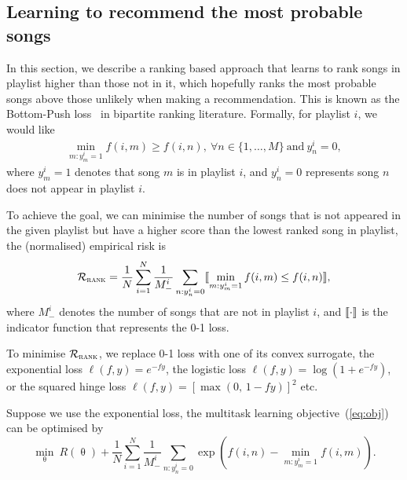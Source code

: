 \subsection{Learning to recommend the most probable songs}
\label{ssec:bploss}


In this section, we describe a ranking based approach that learns to rank songs in playlist higher
than those not in it, which hopefully ranks the most probable songs above those unlikely when making a recommendation.
This is known as the Bottom-Push loss~\cite{rudin2009p} in bipartite ranking literature.
Formally, for playlist $i$, we would like
\begin{equation*}
\begin{aligned}
\min_{m: y_m^i = 1} f(i, m) \ge f(i, n), \ \forall n \in \{1,\dots,M\} \ \text{and} \ y_n^i = 0,
\end{aligned}
\end{equation*}
where $y_m^i = 1$ denotes that song $m$ is in playlist $i$,
and $y_n^i = 0$ represents song $n$ does not appear in playlist $i$.


To achieve the goal, we can minimise the number of songs that is not appeared in the given playlist
but have a higher score than the lowest ranked song in playlist, \ie the (normalised) empirical risk is
\begin{equation}
\label{eq:bprisk}
\mathcal{R}_\textsc{rank} = \frac{1}{N} \sum_{i=1}^N \frac{1}{M_-^i} \sum_{n: y_n^i = 0} \llbracket \min_{m: y_m^i = 1} f(i, m) \le f(i, n) \rrbracket,
\end{equation}
where $M_-^i$ denotes the number of songs that are not in playlist $i$,
and $\llbracket \cdot \rrbracket$ is the indicator function that represents the 0-1 loss.

To minimise $\mathcal{R}_\textsc{rank}$, we replace 0-1 loss with one of its convex surrogate,
\eg the exponential loss $\ell(f, y) = e^{-fy}$, the logistic loss $\ell(f, y) = \log(1 + e^{-fy})$,
or the squared hinge loss $\ell(f, y) = [\max(0, \, 1 - fy)]^2$ etc.

Suppose we use the exponential loss, the multitask learning objective~(\ref{eq:obj}) can be optimised by
\begin{equation}
\label{eq:expobj}
\min_{\uptheta} \ R(\uptheta) + \frac{1}{N} \sum_{i=1}^N \frac{1}{M_-^i} \sum_{n: y_n^i = 0} \exp \left(f(i, n) - \min_{m: y_m^i = 1} f(i, m) \right).
\end{equation}



